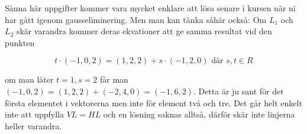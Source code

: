 \documentclass[../../main.tex]{subfiles}
\begin{document}
\begin{solution}{13}

Sånna här uppgifter kommer vara mycket enklare att lösa senare i kursen när ni har gått igenom gausseliminering. Men man kan tänka såhär också: Om $L_1$ och $L_2$ skär varandra kommer deras ekvationer att ge samma resultat vid den punkten

\[t \cdot (-1, 0, 2) = (1, 2, 2) + s \cdot (-1, 2, 0) \text{ där } s, t \in R\]

om man låter $t = 1, s = 2$ får man $(-1, 0, 2) = (1, 2, 2) + (-2, 4, 0) = (-1, 6, 2)$. Detta är ju sant för det första elementet i vektorerna men inte för element två och tre. Det går helt enkelt inte att uppfylla $VL = HL$ och en lösning saknas alltså, därför skär inte linjerna heller varandra.

\end{solution}
\end{document}
